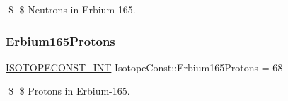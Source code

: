 \$ \$ Neutrons in Erbium-\/165. \mbox{\label{group___isotope_const-_erbium-_er165_gaa7098029dafcc99f7afae3ff512e340c}} 
\subsubsection{\texorpdfstring{Erbium165\+Protons}{Erbium165Protons}}
{\footnotesize\ttfamily \mbox{\hyperlink{group___isotope_const-_macros_ga5f18360b3e99483a35c32d789e62621c}{I\+S\+O\+T\+O\+P\+E\+C\+O\+N\+S\+T\+\_\+\+I\+NT}} Isotope\+Const\+::\+Erbium165\+Protons = 68}

\$ \$ Protons in Erbium-\/165. 